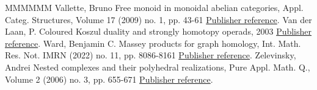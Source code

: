 \begin{thebibliography}{MMMMMM}
 Vallette, Bruno Free monoid in monoidal abelian categories, Appl. Categ. Structures, Volume 17 (2009) no. 1, pp. 43-61 \href{https://alco.centre-mersenne.org/articles/10.5802/alco.347/#MR2471247}{Publisher reference}.
 Van der Laan, P. Coloured Koszul duality and strongly homotopy operads, 2003 \href{https://alco.centre-mersenne.org/articles/10.5802/alco.347/#VanDerLaan03}{Publisher reference}.
 Ward, Benjamin C. Massey products for graph homology, Int. Math. Res. Not. IMRN (2022) no. 11, pp. 8086-8161 \href{https://alco.centre-mersenne.org/articles/10.5802/alco.347/#MR4425832}{Publisher reference}.
 Zelevinsky, Andrei Nested complexes and their polyhedral realizations, Pure Appl. Math. Q., Volume 2 (2006) no. 3, pp. 655-671 \href{https://alco.centre-mersenne.org/articles/10.5802/alco.347/#MR2252112}{Publisher reference}.
\end{thebibliography}
